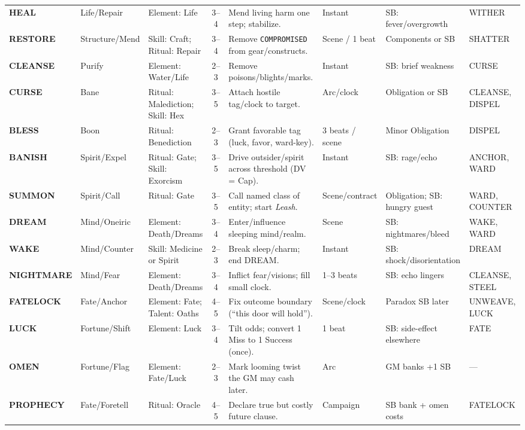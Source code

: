 \begin{longtable}{@{} l l p{4.2cm} c p{6.5cm} p{2.2cm} p{3.2cm} p{2.2cm} @{}}
\textbf{HEAL}      & Life/Repair       & Element: Life                        & 3--4 & Mend living harm one step; stabilize. & Instant & SB: fever/overgrowth & WITHER \\
\textbf{RESTORE}   & Structure/Mend    & Skill: Craft; Ritual: Repair         & 3--4 & Remove \texttt{COMPROMISED} from gear/constructs. & Scene / 1 beat & Components or SB & SHATTER \\
\textbf{CLEANSE}   & Purify            & Element: Water/Life                  & 2--3 & Remove poisons/blights/marks. & Instant & SB: brief weakness & CURSE \\
\textbf{CURSE}     & Bane              & Ritual: Malediction; Skill: Hex      & 3--5 & Attach hostile tag/clock to target. & Arc/clock & Obligation or SB & CLEANSE, DISPEL \\
\textbf{BLESS}     & Boon              & Ritual: Benediction                  & 2--3 & Grant favorable tag (luck, favor, ward-key). & 3 beats / scene & Minor Obligation & DISPEL \\
\textbf{BANISH}    & Spirit/Expel      & Ritual: Gate; Skill: Exorcism        & 3--5 & Drive outsider/spirit across threshold (DV = Cap). & Instant & SB: rage/echo & ANCHOR, WARD \\
\textbf{SUMMON}    & Spirit/Call       & Ritual: Gate                         & 3--5 & Call named class of entity; start \emph{Leash}. & Scene/contract & Obligation; SB: hungry guest & WARD, COUNTER \\
\textbf{DREAM}     & Mind/Oneiric      & Element: Death/Dreams                & 3--4 & Enter/influence sleeping mind/realm. & Scene & SB: nightmares/bleed & WAKE, WARD \\
\textbf{WAKE}      & Mind/Counter      & Skill: Medicine or Spirit            & 2--3 & Break sleep/charm; end DREAM. & Instant & SB: shock/disorientation & DREAM \\
\textbf{NIGHTMARE} & Mind/Fear         & Element: Death/Dreams                & 3--4 & Inflict fear/visions; fill small clock. & 1–3 beats & SB: echo lingers & CLEANSE, STEEL \\

\textbf{FATELOCK}  & Fate/Anchor       & Element: Fate; Talent: Oaths         & 4--5 & Fix outcome boundary (“this door will hold”). & Scene/clock & Paradox SB later & UNWEAVE, LUCK \\
\textbf{LUCK}      & Fortune/Shift     & Element: Luck                        & 3--4 & Tilt odds; convert 1 Miss to 1 Success (once). & 1 beat & SB: side-effect elsewhere & FATE \\
\textbf{OMEN}      & Fortune/Flag      & Element: Fate/Luck                   & 2--3 & Mark looming twist the GM may cash later. & Arc & GM banks +1 SB & — \\
\textbf{PROPHECY}  & Fate/Foretell     & Ritual: Oracle                       & 4--5 & Declare true but costly future clause. & Campaign & SB bank + omen costs & FATELOCK \\


\end{longtable}
